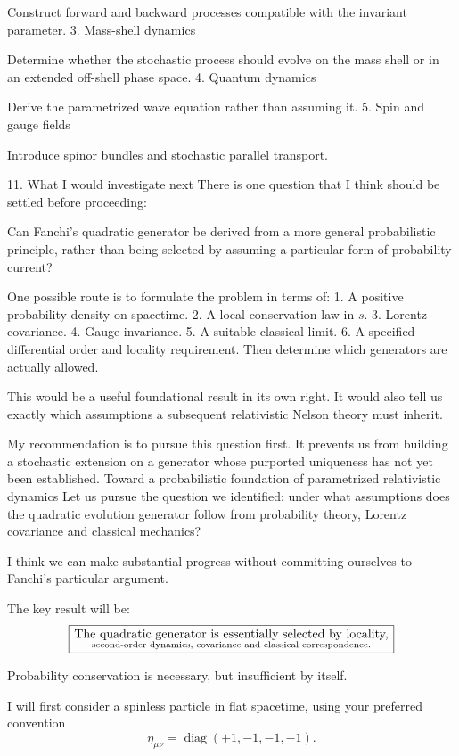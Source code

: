    Construct forward and backward processes compatible with the invariant parameter.
3. Mass-shell dynamics
   
   Determine whether the stochastic process should evolve on the mass shell or in an extended off-shell phase space.
4. Quantum dynamics
   
   Derive the parametrized wave equation rather than assuming it.
5. Spin and gauge fields
   
   Introduce spinor bundles and stochastic parallel transport.

11. What I would investigate next
There is one question that I think should be settled before proceeding:

Can Fanchi's quadratic generator be derived from a more general probabilistic principle, rather than being selected by assuming a particular form of probability current?

One possible route is to formulate the problem in terms of:
1. A positive probability density on spacetime.
2. A local conservation law in \(s\).
3. Lorentz covariance.
4. Gauge invariance.
5. A suitable classical limit.
6. A specified differential order and locality requirement.
Then determine which generators are actually allowed.

This would be a useful foundational result in its own right. It would also tell us exactly which assumptions a subsequent relativistic Nelson theory must inherit.

My recommendation is to pursue this question first. It prevents us from building a stochastic extension on a generator whose purported uniqueness has not yet been established.
Toward a probabilistic foundation of parametrized relativistic dynamics
Let us pursue the question we identified: under what assumptions does the quadratic evolution generator follow from probability theory, Lorentz covariance and classical mechanics?

I think we can make substantial progress without committing ourselves to Fanchi's particular argument.

The key result will be:
\[
\boxed{
\text{The quadratic generator is essentially selected by locality,}
\atop
\text{second-order dynamics, covariance and classical correspondence.}
}
\]

Probability conservation is necessary, but insufficient by itself.

I will first consider a spinless particle in flat spacetime, using your preferred convention
\[
\eta_{\mu\nu}=\operatorname{diag}(+1,-1,-1,-1).
\]

